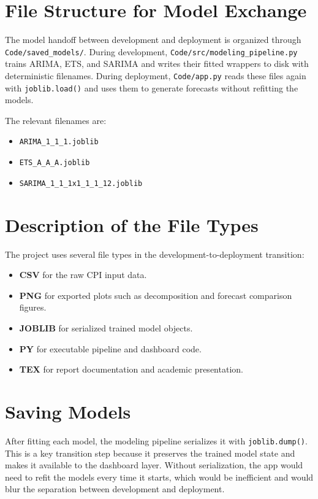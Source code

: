 \section{File Structure for Model Exchange}

The model handoff between development and deployment is organized through \texttt{Code/saved\_models/}. During development, \texttt{Code/src/modeling\_pipeline.py} trains ARIMA, ETS, and SARIMA and writes their fitted wrappers to disk with deterministic filenames. During deployment, \texttt{Code/app.py} reads these files again with \texttt{joblib.load()} and uses them to generate forecasts without refitting the models.

The relevant filenames are:

\begin{itemize}
	\item \texttt{ARIMA\_1\_1\_1.joblib}
	\item \texttt{ETS\_A\_A\_A.joblib}
	\item \texttt{SARIMA\_1\_1\_1x1\_1\_1\_12.joblib}
\end{itemize}

\section{Description of the File Types}

The project uses several file types in the development-to-deployment transition:

\begin{itemize}
	\item \textbf{CSV} for the raw CPI input data.
	\item \textbf{PNG} for exported plots such as decomposition and forecast comparison figures.
	\item \textbf{JOBLIB} for serialized trained model objects.
	\item \textbf{PY} for executable pipeline and dashboard code.
	\item \textbf{TEX} for report documentation and academic presentation.
\end{itemize}

\section{Saving Models}

After fitting each model, the modeling pipeline serializes it with \texttt{joblib.dump()}. This is a key transition step because it preserves the trained model state and makes it available to the dashboard layer. Without serialization, the app would need to refit the models every time it starts, which would be inefficient and would blur the separation between development and deployment.


